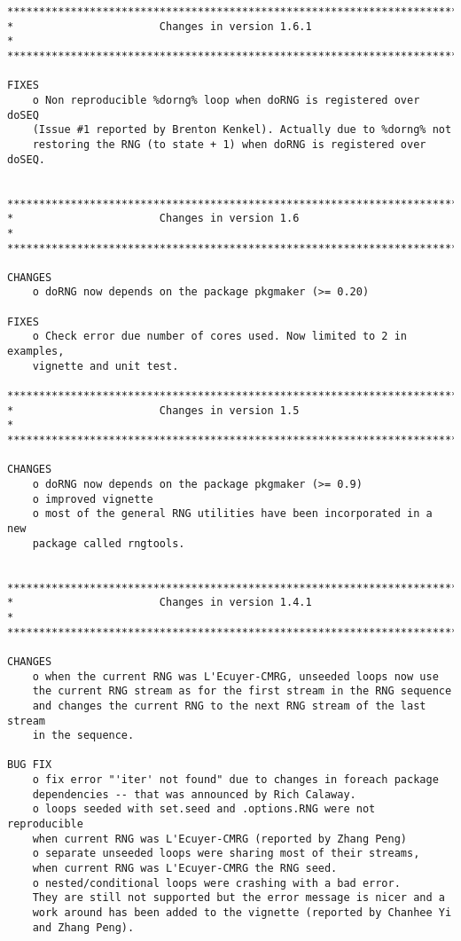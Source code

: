 \documentclass[a4paper,12pt]{article}\usepackage[]{graphicx}\usepackage[]{color}
\begin{document}
{\scriptsize
\begin{verbatim}
*************************************************************************
*                       Changes in version 1.6.1                        *
*************************************************************************

FIXES
    o Non reproducible %dorng% loop when doRNG is registered over doSEQ 
    (Issue #1 reported by Brenton Kenkel). Actually due to %dorng% not 
    restoring the RNG (to state + 1) when doRNG is registered over doSEQ.
    

*************************************************************************
*                       Changes in version 1.6                          *
*************************************************************************

CHANGES
    o doRNG now depends on the package pkgmaker (>= 0.20)
    
FIXES
    o Check error due number of cores used. Now limited to 2 in examples,
    vignette and unit test.

*************************************************************************
*                       Changes in version 1.5                          *
*************************************************************************

CHANGES
    o doRNG now depends on the package pkgmaker (>= 0.9)
    o improved vignette
    o most of the general RNG utilities have been incorporated in a new
    package called rngtools.
    

*************************************************************************
*                       Changes in version 1.4.1                        *
*************************************************************************

CHANGES
    o when the current RNG was L'Ecuyer-CMRG, unseeded loops now use 
    the current RNG stream as for the first stream in the RNG sequence 
    and changes the current RNG to the next RNG stream of the last stream 
    in the sequence. 

BUG FIX
    o fix error "'iter' not found" due to changes in foreach package 
    dependencies -- that was announced by Rich Calaway.
    o loops seeded with set.seed and .options.RNG were not reproducible
    when current RNG was L'Ecuyer-CMRG (reported by Zhang Peng)
    o separate unseeded loops were sharing most of their streams, 
    when current RNG was L'Ecuyer-CMRG the RNG seed.
    o nested/conditional loops were crashing with a bad error. 
    They are still not supported but the error message is nicer and a 
    work around has been added to the vignette (reported by Chanhee Yi 
    and Zhang Peng).


\end{verbatim}}
\end{document}
